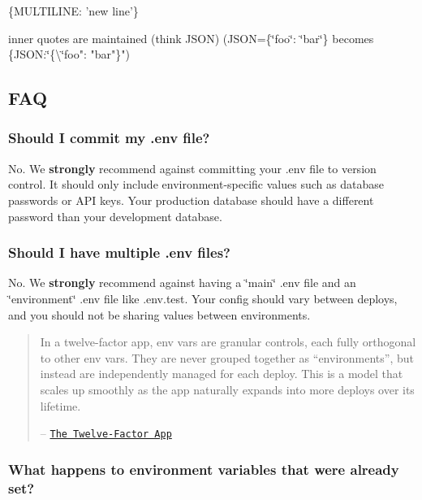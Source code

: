\begin{DoxyCode}
\{MULTILINE: 'new
line'\}
\end{DoxyCode}

\begin{DoxyItemize}
\item inner quotes are maintained (think J\+S\+ON) ({\ttfamily J\+S\+ON=\{\char`\"{}foo\char`\"{}\+: \char`\"{}bar\char`\"{}\}} becomes {\ttfamily \{J\+S\+ON\+:\char`\"{}\{\textbackslash{}\char`\"{}foo"\+: "bar"\}"})
\end{DoxyItemize}

\subsection*{F\+AQ}

\subsubsection*{Should I commit my {\ttfamily .env} file?}

No. We {\bfseries strongly} recommend against committing your {\ttfamily .env} file to version control. It should only include environment-\/specific values such as database passwords or A\+PI keys. Your production database should have a different password than your development database.

\subsubsection*{Should I have multiple {\ttfamily .env} files?}

No. We {\bfseries strongly} recommend against having a \char`\"{}main\char`\"{} {\ttfamily .env} file and an \char`\"{}environment\char`\"{} {\ttfamily .env} file like {\ttfamily .env.\+test}. Your config should vary between deploys, and you should not be sharing values between environments.

\begin{quote}
In a twelve-\/factor app, env vars are granular controls, each fully orthogonal to other env vars. They are never grouped together as “environments”, but instead are independently managed for each deploy. This is a model that scales up smoothly as the app naturally expands into more deploys over its lifetime.

– \href{http://12factor.net/config}{\tt The Twelve-\/\+Factor App} \end{quote}


\subsubsection*{What happens to environment variables that were already set?}

